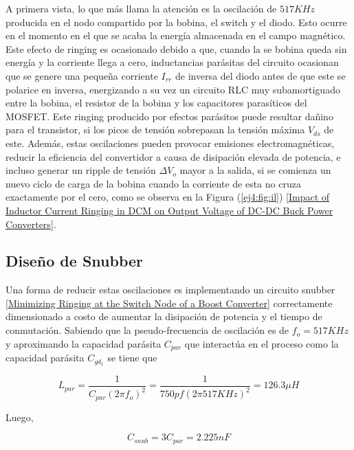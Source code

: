 A primera vista, lo que más llama la atención es la oscilación de $517KHz$ producida en el nodo compartido por la bobina, el switch y el diodo. Esto ocurre en el momento en el que se acaba la energía almacenada en el campo magnético. Este efecto de ringing es ocasionado debido a que, cuando la se bobina queda sin energía y la corriente llega a cero, inductancias parásitas del circuito ocasionan que se genere una pequeña corriente $I_{rr}$ de inversa del diodo antes de que este se polarice en inversa, energizando a su vez un circuito RLC muy subamortiguado entre la bobina, el resistor de la bobina y los capacitores parasíticos del MOSFET. Este ringing producido por efectos parásitos puede resultar dañino para el transistor, si los picos de tensión sobrepasan la tensión máxima $V_{ds}$ de este. Además, estas oscilaciones pueden provocar emisiones electromagnéticas, reducir la eficiencia del convertidor a causa de disipación elevada de potencia, e incluso generar un ripple de tensión $\Delta V_o$ mayor a la salida, si se comienza un nuevo ciclo de carga de la bobina cuando la corriente de esta no cruza exactamente por el cero, como se observa en la Figura (\ref{ej4:fig:il}) [\href{https://www.researchgate.net/publication/317525001_Impact_of_inductor_current_ringing_in_DCM_on_output_voltage_of_DC-DC_buck_power_converters}{Impact of Inductor Current Ringing in DCM on Output Voltage of DC-DC Buck Power Converters}].

\subsection{Diseño de Snubber}

Una forma de reducir estas oscilaciones es implementando un circuito snubber [\href{https://www.ti.com/lit/an/slva255/slva255.pdf}{Minimizing Ringing at the Switch Node of a Boost Converter}] correctamente dimensionado a costo de aumentar la disipación de potencia y el tiempo de conmutación. Sabiendo que la pseudo-frecuencia de oscilación es de $f_{o} = 517KHz$ y aproximando la capacidad parásita $C_{par}$ que interactúa en el proceso como la capacidad parásita $C_{gd_1}$ se tiene que

\begin{equation}
	L_{par} = \frac{1}{C_{par}\left( 2\pi f_{o} \right)^2} = \frac{1}{750pf\left( 2\pi 517KHz \right)^2} = 126.3\mu H 
\end{equation}

Luego,

\begin{equation}
	C_{snub} = 3C_{par} = 2.225nF
\end{equation}


